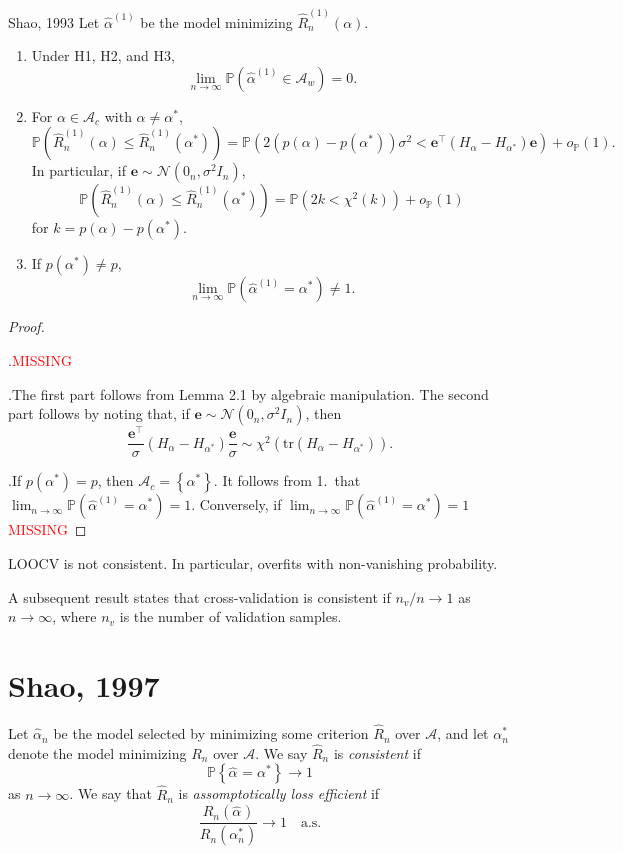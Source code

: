 \documentclass[12pt, letter paper]{article}
\newcommand{\1}{\mathmybb{1}}
\newcommand{\0}{\emptyset}
\newcommand{\prob}{\mathbb{P}}
\newcommand{\paren}[1]{\left(#1 \right)}
\newcommand{\set}[1]{\left\{ #1 \right\}}
\newcommand{\Acal}{\mathcal{A}}
\newcommand{\Ncal}{\mathcal{N}}
\newcommand{\e}{\boldsymbol{e}}
\newcommand{\alphahat}[1]{\hat{\alpha}^{#1}}
\newcommand{\loocv}[1]{\hat{R}^{(1)}_{n}\paren{#1}}
\newcommand{\op}[1]{o_{\prob}\paren{#1}}
\begin{document}
\begin{proposition}{{Shao, 1993}}
    Let \(\alphahat{(1)}\) be the model minimizing \(\loocv{\alpha}\).
    \begin{enumerate}
        \item Under H1, H2, and H3, \[\lim_{n\to\infty}\prob\paren{\alphahat{(1)}\in\Acal_{w}}=0.\]
        \item For \(\alpha\in\Acal_{c}\) with \(\alpha\neq\alpha^{*}\),\[\prob\paren{\loocv{\alpha}\leq \loocv{\alpha^{*}}} = \prob\paren{2\paren{p(\alpha) - p(\alpha^{*})}\sigma^{2} < \e^{\top}(H_{\alpha} - H_{\alpha^{*}})\e} + \op{1}.\] In particular, if \(\e\sim\Ncal(0_{n}, \sigma^{2}I_n)\), \[\prob\paren{\loocv{\alpha}\leq \loocv{\alpha^{*}}} = \prob\paren{2k < \chi^{2}(k)} + \op{1} \] for \(k=p(\alpha) - p(\alpha^{*})\).
        \item If \(p(\alpha^*) \neq p\), \[\lim_{n\to\infty}\prob\paren{\alphahat{(1)}=\alpha^{*}}\neq 1.\]
    \end{enumerate}
\end{proposition}

\begin{proof}
    \(\)

    .\quad \textcolor{red}{MISSING}

    .\quad The first part follows from Lemma 2.1 by algebraic manipulation. The second part follows by noting that, if \(\e\sim\Ncal(0_{n}, \sigma^{2}I_{n})\), then \[\frac{\e^{\top}}{\sigma}\paren{H_{\alpha} - H_{\alpha^{*}}}\frac{\e}{\sigma}\sim\chi^{2}\paren{\mathrm{tr}\paren{H_{\alpha}-H_{\alpha^{*}}}}.\]

    .\quad If \(p(\alpha^{*}) = p\), then \(\Acal_{c} = \set{\alpha^{*}}\). It follows from 1.\ that \(\lim_{n\to\infty}\prob\paren{\alphahat{(1)}=\alpha^{*} }= 1\).
    Conversely, if \(\lim_{n\to\infty}\prob\paren{\alphahat{(1)}=\alpha^{*}} = 1\) \textcolor{red}{MISSING}
\end{proof}

\begin{proposition}[Corollary]{}
    LOOCV is not consistent. In particular, overfits with non-vanishing probability.
\end{proposition}

A subsequent result states that cross-validation is consistent if \(n_{v}/n\to 1\) as \(n\to\infty\), where \(n_{v}\) is the number of validation samples.

\section{Shao, 1997~\cite{shao_asymptotic_1997}}
\begin{definition}
    Let \(\alphahat{}_{n}\) be the model selected by minimizing some criterion \(\hat{R}_{n}\) over \(\Acal\), and let \(\alpha^{*}_{n}\) denote the model minimizing \(R_{n}\) over \(\Acal\). We say \(\hat{R}_{n}\) is \emph{consistent} if 
    \[\prob\set{\alphahat{} = \alpha^{*}}\to 1\]
    as \(n\to\infty\). We say that \(\hat{R}_{n}\) is \emph{assomptotically loss efficient} if 
    \[\frac{R_{n}(\alphahat{})}{R_{n}(\alpha^{*}_{n})}\to 1\quad\text{a.s.}\]
\end{definition}
\end{document}
